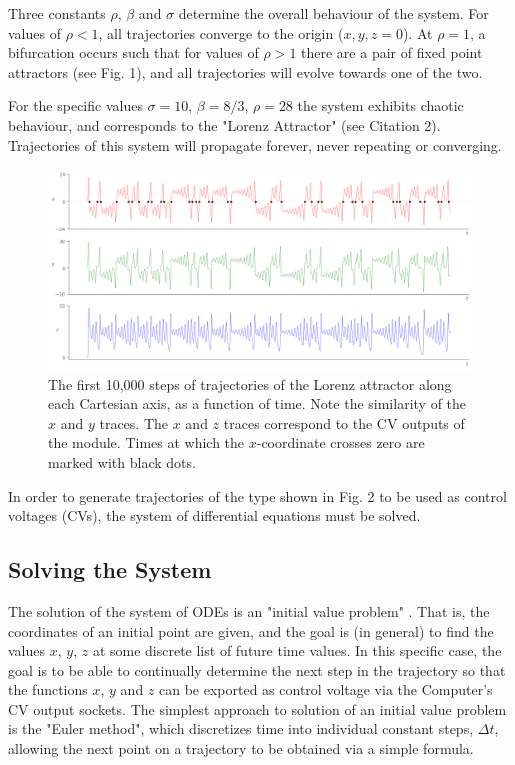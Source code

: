 \documentclass{tufte-handout}
\begin{document}
Three constants $\rho$, $\beta$ and $\sigma$ determine the overall behaviour of the system. For values of $\rho < 1$, all trajectories converge to the origin ($x, y, z = 0$). At $\rho=1$, a bifurcation occurs such that for values of $\rho > 1$ there are a pair of fixed point attractors (see Fig. 1), and all trajectories will evolve towards one of the two. 

For the specific values $\sigma=10$, $\beta=8/3$, $\rho=28$ the system exhibits chaotic behaviour, and corresponds to the "Lorenz Attractor" (see Citation 2). Trajectories of this system will propagate forever, never repeating or converging.


\begin{figure}[h]
  \includegraphics[width=\linewidth]{control_voltages.png}%
  \caption{The first 10,000 steps of trajectories of the Lorenz attractor along each Cartesian axis, as a function of time. Note the similarity of the $x$ and $y$ traces. The $x$ and $z$ traces correspond to the CV outputs of the module. Times at which the $x$-coordinate crosses zero are marked with black dots.}%
  \label{fig:control_voltages}%
\end{figure}

In order to generate trajectories of the type shown in Fig. 2 to be used as control voltages (CVs), the system of differential equations must be solved.

\subsection{Solving the System}\label{sec:solving_the_system}

The solution of the system of ODEs is an "initial value problem" . That is, the coordinates of an initial point are given, and the goal is (in general) to find the values $x$, $y$, $z$ at some discrete list of future time values. In this specific case, the goal is to be able to continually determine the next step in the trajectory so that the functions $x$, $y$ and $z$ can be exported as control voltage via the Computer's CV output sockets.
The simplest approach to solution of an initial value problem is the "Euler method", which discretizes time into individual constant steps, $\Delta t$, allowing the next point on a trajectory to be obtained via a simple formula.
\end{document}
